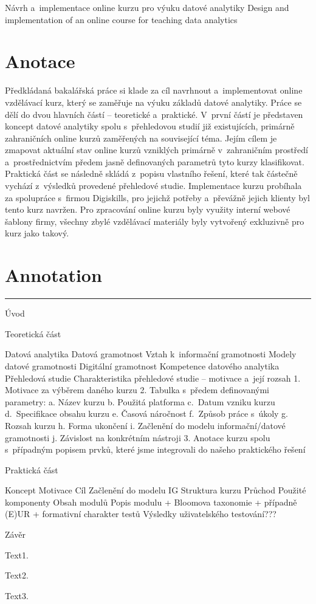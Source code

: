 Návrh a~implementace online kurzu pro výuku datové analytiky Design and
implementation of an online course for teaching data analytics

\chapter*{Anotace}

Předkládaná bakalářská práce si klade za cíl navrhnout a~implementovat
online vzdělávací kurz, který se zaměřuje na výuku základů datové
analytiky. Práce se dělí do dvou hlavních částí -- teoretické
a~praktické. V~první částí je představen koncept datové analytiky spolu
s~přehledovou studií již existujících, primárně zahraničních online kurzů
zaměřených na související téma. Jejím cílem je zmapovat aktuální stav
online kurzů vzniklých primárně v~zahraničním prostředí
a~prostřednictvím předem jasně definovaných parametrů tyto kurzy
klasifikovat. Praktická část se následně skládá z~popisu vlastního
řešení, které tak částečně vychází z~výsledků provedené přehledové
studie. Implementace kurzu probíhala za spolupráce s~firmou Digiskills,
pro jejichž potřeby a~převážně jejich klienty byl tento kurz navržen.
Pro zpracování online kurzu byly využity interní webové šablony firmy,
všechny zbylé vzdělávací materiály byly vytvořený exkluzivně pro kurz
jako takový.

\chapter*{Annotation}

\begin{center}\rule{0.5\linewidth}{0.5pt}\end{center}

Úvod

Teoretická část

Datová analytika Datová gramotnost Vztah k~informační gramotnosti Modely
datové gramotnosti Digitální gramotnost Kompetence datového analytika
Přehledová studie Charakteristika přehledové studie -- motivace a~její
rozsah 1. Motivace za výběrem daného kurzu 2. Tabulka s~předem
definovanými parametry: a. Název kurzu b. Použitá platforma c.~Datum
vzniku kurzu d.~Specifikace obsahu kurzu e. Časová náročnost f.~Způsob
práce s~úkoly g. Rozsah kurzu h. Forma ukončení i. Začlenění do modelu
informační/datové gramotnosti j. Závislost na konkrétním nástroji 3.
Anotace kurzu spolu s~případným popisem prvků, které jsme integrovali do
našeho praktického řešení

Praktická část

Koncept Motivace Cíl Začlenění do modelu IG Struktura kurzu Průchod
Použité komponenty Obsah modulů Popis modulu + Bloomova taxonomie +
případně (E)UR + formativní charakter testů Výsledky uživatelského
testování???

Závěr

Text1. \parencite{digicomp17}

Text2. \parencite{workshop16}

Text3. \parencite{ecdl17}
